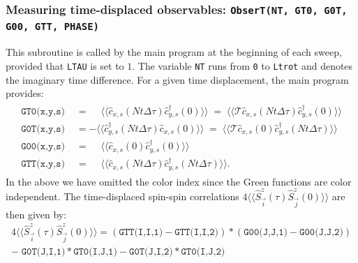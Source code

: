 \subsubsection[Measuring time-displaced observables: \texttt{ObserT}]{Measuring time-displaced observables: \texttt{ObserT(NT, GT0, G0T, G00, GTT, PHASE)}}  \label{sec:TimeDispObs}
%
This subroutine is called by the main program at the beginning of each sweep, provided that \texttt{LTAU}  is set to $1$. The variable \texttt{NT} runs from \texttt{0}  to \texttt{Ltrot} and denotes the imaginary time difference. For a given time  displacement, the main program provides:
\begin{align}
\begin{aligned}
\label{Time_displaced_green.eq}
\texttt{GT0(x,y,s) }  &=   \phantom{+} \langle \langle \hat{c}^{\phantom\dagger}_{x,s} (Nt \Delta \tau)   \hat{c}^{\dagger}_{y,s} (0)   \rangle \rangle \;=\; \langle \langle \mathcal{T} \hat{c}^{\phantom\dagger}_{x,s} (Nt \Delta \tau)   \hat{c}^{\dagger}_{y,s} (0)   \rangle \rangle   \\
\texttt{G0T(x,y,s) }   &=  -   \langle \langle   \hat{c}^{\dagger}_{y,s} (Nt \Delta \tau)    \hat{c}^{\phantom\dagger}_{x,s} (0)    \rangle \rangle \;=\;
    \langle \langle \mathcal{T} \hat{c}^{\phantom\dagger}_{x,s} (0)    \hat{c}^{\dagger}_{y,s} (Nt \Delta \tau)   \rangle \rangle    \\
  \texttt{G00(x,y,s) }  &=    \phantom{+} \langle \langle \hat{c}^{\phantom\dagger}_{x,s} (0)   \hat{c}^{\dagger}_{y,s} (0)   \rangle \rangle     \\
    \texttt{GTT(x,y,s) }  &=   \phantom{+} \langle \langle \hat{c}^{\phantom\dagger}_{x,s} (Nt \Delta \tau)   \hat{c}^{\dagger}_{y,s} (Nt \Delta \tau)   \rangle \rangle.
\end{aligned}
\end{align}
In the above we have omitted the color index since  the  Green functions are color independent.  The time-displaced spin-spin correlations 
$ 4 \langle \langle \hat{S}^{z}_{\vec{i}} (\tau)  \hat{S}^{z}_{\vec{j}} (0)\rangle \rangle   $ 
are then given by: 
\begin{multline}
	4 \langle \langle \hat{S}^{z}_{\vec{i}} (\tau)  \hat{S}^{z}_{\vec{j}} (0)\rangle \rangle
	=  ( \texttt{GTT(I,I,1)} -  \texttt{GTT(I,I,2)} ) * ( \texttt{G00(J,J,1)} -  \texttt{G00(J,J,2)} )     \\  
	-   \; \texttt{G0T(J,I,1)}*\texttt{GT0(I,J,1)}  -  \texttt{G0T(J,I,2)}* \texttt{GT0(I,J,2)}
\end{multline}

